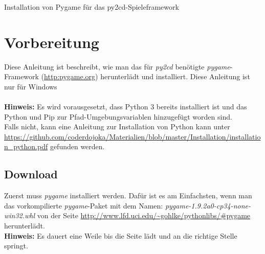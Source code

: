 \documentclass[ngerman,oneside, a4letter]{article}
\begin{document}
{\huge Installation von Pygame für das py2cd-Spieleframework}

\section{Vorbereitung}
Diese Anleitung ist beschreibt, wie man das für \emph{py2cd} benötigte \emph{pygame}-Framework (\url{http:pygame.org}) herunterlädt und installiert. Diese Anleitung ist nur für Windows 
\\
\\
\textbf{Hinweis:} Es wird vorausgesetzt, dass Python 3 bereits installiert ist und das Python und Pip zur Pfad-Umgebungsvariablen hinzugefügt worden sind.
\\
Falls nicht, kann eine Anleitung zur Installation von Python kann unter \url{https://github.com/coderdojoka/Materialien/blob/master/Installation/installation_python.pdf} gefunden werden.

\subsection{Download}
Zuerst muss \emph{pygame} installiert werden. Dafür ist es am Einfachsten, wenn man das vorkompilierte \emph{pygame}-Paket mit dem Namen: \emph{pygame-1.9.2a0-cp34-none-win32.whl} von der Seite \url{http://www.lfd.uci.edu/~gohlke/pythonlibs/#pygame} herunterlädt.
\\
\textbf{Hinweis:} Es dauert eine Weile bis die Seite lädt und an die richtige Stelle springt.

\begin{center}
\end{center}
\end{document}
